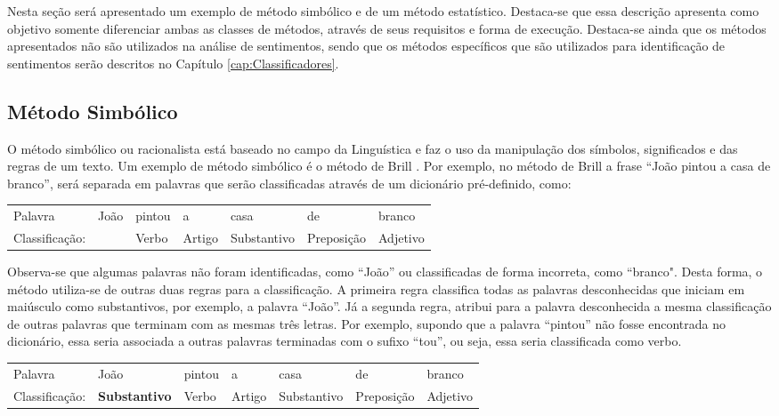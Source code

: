 Nesta seção será apresentado um exemplo de método simbólico e de um método
estatístico.
Destaca-se que essa descrição apresenta como objetivo somente diferenciar
ambas as classes de métodos, através de seus requisitos e forma de execução.
Destaca-se ainda que os métodos apresentados não são utilizados na
análise de sentimentos, sendo que os métodos específicos que são utilizados para
identificação de sentimentos serão descritos no Capítulo \ref{cap:Classificadores}.


\subsection{Método Simbólico}
O método simbólico ou racionalista está
baseado no campo da Linguística e faz o uso da manipulação dos símbolos,
significados e das regras de um texto. Um exemplo de método simbólico é o
método de Brill \cite{Brill:1992:SRP:974499.974526}. Por exemplo, no método de
Brill a frase ``João pintou a casa de branco'', será separada em palavras que
serão classificadas através de um dicionário pré-definido, como:

\begin{table}[htb]
\centering
\begin{tabular}{l|l|l|l|l|l|l}
Palavra         & João        & pintou & a      & casa        & de
& branco
\\
Classificação:   & 			   & Verbo  & Artigo & Substantivo & Preposição & Adjetivo
\end{tabular}
\label{my-label}
\end{table}

Observa-se que algumas palavras não foram
identificadas, como ``João'' ou classificadas de forma incorreta, como
``branco". Desta forma, o método utiliza-se de outras duas regras para a
classificação.
A primeira regra classifica todas as palavras desconhecidas que iniciam em
maiúsculo como substantivos, por exemplo, a palavra ``João''. Já a segunda regra, atribui para a palavra desconhecida a mesma classificação
de outras palavras que terminam com as mesmas três letras. Por exemplo, supondo
que a palavra ``pintou'' não fosse encontrada no dicionário, essa seria
associada a outras palavras terminadas com o sufixo ``tou'', ou seja, essa seria
classificada como verbo.

\begin{table}[htb]
\centering
\begin{tabular}{l|l|l|l|l|l|l}
Palavra         & João        & pintou & a      & casa        & de
& branco
\\
Classificação:   & \textbf{Substantivo} & Verbo  & Artigo & Substantivo &
Preposição & Adjetivo
\end{tabular}
\label{my-label}
\end{table}



